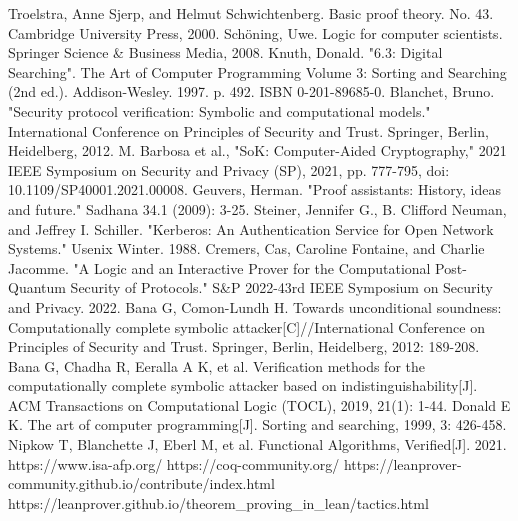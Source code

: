 \documentclass[conference]{IEEEtran}
\begin{document}
\begin{thebibliography}{00}
 Troelstra, Anne Sjerp, and Helmut Schwichtenberg. Basic proof theory. No. 43. Cambridge University Press, 2000.
 Schöning, Uwe. Logic for computer scientists. Springer Science \& Business Media, 2008.
 Knuth, Donald. "6.3: Digital Searching". The Art of Computer Programming Volume 3: Sorting and Searching (2nd ed.). Addison-Wesley. 1997. p. 492. ISBN 0-201-89685-0.
 Blanchet, Bruno. "Security protocol verification: Symbolic and computational models." International Conference on Principles of Security and Trust. Springer, Berlin, Heidelberg, 2012.
 M. Barbosa et al., "SoK: Computer-Aided Cryptography," 2021 IEEE Symposium on Security and Privacy (SP), 2021, pp. 777-795, doi: 10.1109/SP40001.2021.00008.
 Geuvers, Herman. "Proof assistants: History, ideas and future." Sadhana 34.1 (2009): 3-25.
 Steiner, Jennifer G., B. Clifford Neuman, and Jeffrey I. Schiller. "Kerberos: An Authentication Service for Open Network Systems." Usenix Winter. 1988.
 Cremers, Cas, Caroline Fontaine, and Charlie Jacomme. "A Logic and an Interactive Prover for the Computational Post-Quantum Security of Protocols." S\&P 2022-43rd IEEE Symposium on Security and Privacy. 2022.
 Bana G, Comon-Lundh H. Towards unconditional soundness: Computationally complete symbolic attacker[C]//International Conference on Principles of Security and Trust. Springer, Berlin, Heidelberg, 2012: 189-208.
 Bana G, Chadha R, Eeralla A K, et al. Verification methods for the computationally complete symbolic attacker based on indistinguishability[J]. ACM Transactions on Computational Logic (TOCL), 2019, 21(1): 1-44.
 Donald E K. The art of computer programming[J]. Sorting and searching, 1999, 3: 426-458.
 Nipkow T, Blanchette J, Eberl M, et al. Functional Algorithms, Verified[J]. 2021.
 https://www.isa-afp.org/
 https://coq-community.org/
 https://leanprover-community.github.io/contribute/index.html
 https://leanprover.github.io/theorem\_proving\_in\_lean/tactics.html
\end{thebibliography}
\end{document}
